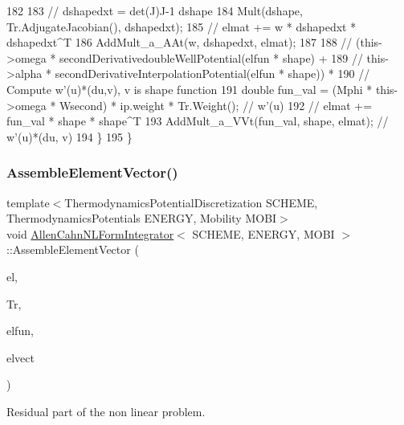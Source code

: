 \begin{DoxyCode}
182 
183     \textcolor{comment}{// dshapedxt =  det(J)J-1 dshape}
184     Mult(dshape, Tr.AdjugateJacobian(), dshapedxt);
185     \textcolor{comment}{// elmat += w * dshapedxt * dshapedxt^T}
186     AddMult\_a\_AAt(w, dshapedxt, elmat);
187 
188     \textcolor{comment}{//  (this->omega * secondDerivativedoubleWellPotential(elfun * shape) +}
189     \textcolor{comment}{//   this->alpha * secondDerivativeInterpolationPotential(elfun * shape)) *}
190     \textcolor{comment}{// Compute w'(u)*(du,v), v is shape function}
191     \textcolor{keywordtype}{double} fun\_val = (Mphi * this->omega * Wsecond) * ip.weight * Tr.Weight();  \textcolor{comment}{// w'(u)}
192     \textcolor{comment}{// elmat += fun\_val * shape * shape^T}
193     AddMult\_a\_VVt(fun\_val, shape, elmat);  \textcolor{comment}{// w'(u)*(du, v)}
194   \}
195 \}
\end{DoxyCode}
\mbox{\label{classAllenCahnNLFormIntegrator_a4cb7cff96ecd5b236ba1573b4fdc816c}} 
\subsubsection{\texorpdfstring{Assemble\+Element\+Vector()}{AssembleElementVector()}}
{\footnotesize\ttfamily template$<$Thermodynamics\+Potential\+Discretization S\+C\+H\+E\+ME, Thermodynamics\+Potentials E\+N\+E\+R\+GY, Mobility M\+O\+BI$>$ \\
void \hyperlink{classAllenCahnNLFormIntegrator}{Allen\+Cahn\+N\+L\+Form\+Integrator}$<$ S\+C\+H\+E\+ME, E\+N\+E\+R\+GY, M\+O\+BI $>$\+::Assemble\+Element\+Vector (\begin{DoxyParamCaption}\item[{const mfem\+::\+Finite\+Element \&}]{el,  }\item[{mfem\+::\+Element\+Transformation \&}]{Tr,  }\item[{const mfem\+::\+Vector \&}]{elfun,  }\item[{mfem\+::\+Vector \&}]{elvect }\end{DoxyParamCaption})\hspace{0.3cm}{\ttfamily [virtual]}}



Residual part of the non linear problem. 


